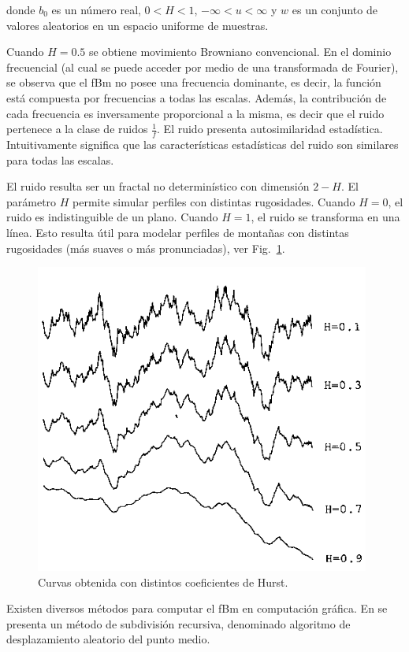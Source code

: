 donde $b_{0}$ es un número real, $0 < H < 1$, $-\infty < u < \infty $ y $w$ es un conjunto de valores aleatorios en un espacio uniforme de muestras.

Cuando $H = 0.5$ se obtiene movimiento Browniano convencional.
En el dominio frecuencial (al cual se puede acceder por medio de una transformada de Fourier), se observa que el fBm no posee una frecuencia dominante, es decir, la función está compuesta por frecuencias a todas las escalas.
Además, la contribución de cada frecuencia es inversamente proporcional a la misma, es decir que el ruido pertenece a la clase de ruidos $\frac{1}{f}$.
El ruido presenta autosimilaridad estadística.
Intuitivamente significa que las características estadísticas del ruido son similares para todas las escalas.

El ruido resulta ser un fractal no determinístico con dimensión $2-H$.
El parámetro $H$ permite simular perfiles con distintas rugosidades.
Cuando $H = 0$, el ruido es indistinguible de un plano.
Cuando $H = 1$, el ruido se transforma en una línea.
Esto resulta útil para modelar perfiles de montañas con distintas rugosidades (más suaves o más pronunciadas), ver Fig.~\ref{fg:hurst}.

\begin{figure}
\center
\includegraphics[width=11cm]{figures/hurst}
\caption{Curvas obtenida con distintos coeficientes de Hurst.}
\label{fg:hurst}
\end{figure}

Existen diversos métodos para computar el fBm en computación gráfica.
En \cite{Fournier1982} se presenta un método de subdivisión recursiva, denominado algoritmo de desplazamiento aleatorio del punto medio.


